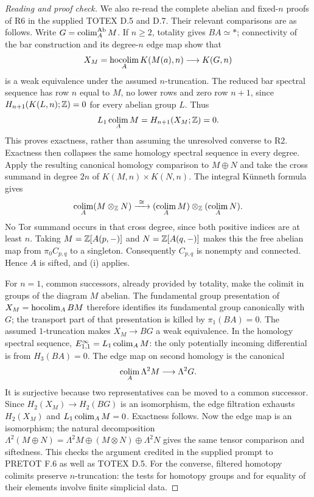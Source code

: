 \begin{proof}[Reading and proof check]
We also re-read the complete abelian and fixed-$n$ proofs of R6 in
the supplied TOTEX D.5 and D.7. Their relevant comparisons are as
follows. Write $G=\operatorname*{colim}_A^{\mathrm{Ab}}M$. If $n\geq2$, totality gives
$BA\simeq *$; connectivity of the bar construction and its degree-$n$
edge map show that
\[
 X_M=\operatorname*{hocolim}_A K(M(a),n)\longrightarrow K(G,n)
\]
is a weak equivalence under the assumed $n$-truncation. The reduced
bar spectral sequence has row $n$ equal to $M$, no lower rows and
zero row $n+1$, since $H_{n+1}(K(L,n);\mathbb Z)=0$ for every abelian
group $L$. Thus
\[
 L_1\operatorname*{colim}_A M=H_{n+1}(X_M;\mathbb Z)=0.
\]
This proves exactness, rather than assuming the unresolved converse
to R2. Exactness then collapses the same homology spectral sequence
in every degree. Apply the resulting canonical homology comparison
to $M\oplus N$ and take the cross summand in degree $2n$ of
$K(M,n)\times K(N,n)$. The integral K\"unneth formula gives
\[
 \operatorname*{colim}_A(M\otimes_\mathbb Z N)
 \xrightarrow{\ \cong\ }
 (\operatorname*{colim}_A M)\otimes_\mathbb Z(\operatorname*{colim}_A N).
\]
No Tor summand occurs in that cross degree, since both positive
indices are at least $n$. Taking $M=\mathbb Z[A(p,-)]$ and
$N=\mathbb Z[A(q,-)]$ makes this the free abelian map from
$\pi_0 C_{p,q}$ to a singleton. Consequently $C_{p,q}$ is nonempty
and connected. Hence $A$ is sifted, and (i) applies.

For $n=1$, common successors, already provided by totality, make
the colimit in groups of the diagram $M$ abelian. The fundamental
group presentation of $X_M=\operatorname*{hocolim}_A BM$ therefore identifies
its fundamental group canonically with $G$; the transport part of
that presentation is killed by $\pi_1(BA)=0$. The assumed
$1$-truncation makes $X_M\to BG$ a weak equivalence. In the
homology spectral sequence, $E^\infty_{1,1}=L_1\operatorname*{colim}_A M$:
the only potentially incoming differential is from
$H_3(BA)=0$. The edge map on second homology is the canonical
\[
 \operatorname*{colim}_A\Lambda^2 M\longrightarrow\Lambda^2G.
\]
It is surjective because two representatives can be moved to a
common successor. Since $H_2(X_M)\to H_2(BG)$ is an isomorphism,
the edge filtration exhausts $H_2(X_M)$ and
$L_1\operatorname*{colim}_A M=0$. Exactness follows. Now the edge map is an
isomorphism; the natural decomposition
$\Lambda^2(M\oplus N)=\Lambda^2M\oplus(M\otimes N)\oplus\Lambda^2N$
gives the same tensor comparison and siftedness. This checks the
argument credited in the supplied prompt to PRETOT F.6 as well as
TOTEX D.5. For the converse, filtered homotopy colimits preserve
$n$-truncation: the tests for homotopy groups and for equality of
their elements involve finite simplicial data.
\end{proof}

